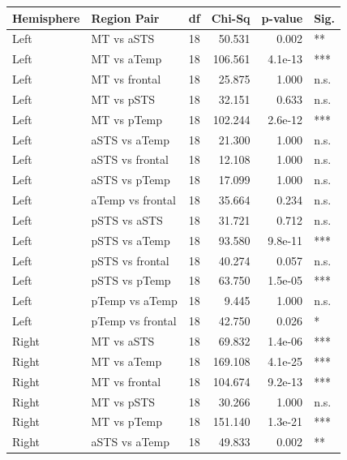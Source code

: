 \begin{table}[h]
\centering
\begin{tabular}{llrrrl}
\toprule
 Hemisphere   & Region Pair      &   df &   Chi-Sq &   p-value & Sig.   \\
\midrule
 Left         & MT vs aSTS       &   18 &   50.531 &     0.002 & **     \\
 Left         & MT vs aTemp      &   18 &  106.561 &   4.1e-13 & ***    \\
 Left         & MT vs frontal    &   18 &   25.875 &     1.000 & n.s.   \\
 Left         & MT vs pSTS       &   18 &   32.151 &     0.633 & n.s.   \\
 Left         & MT vs pTemp      &   18 &  102.244 &   2.6e-12 & ***    \\
 Left         & aSTS vs aTemp    &   18 &   21.300 &     1.000 & n.s.   \\
 Left         & aSTS vs frontal  &   18 &   12.108 &     1.000 & n.s.   \\
 Left         & aSTS vs pTemp    &   18 &   17.099 &     1.000 & n.s.   \\
 Left         & aTemp vs frontal &   18 &   35.664 &     0.234 & n.s.   \\
 Left         & pSTS vs aSTS     &   18 &   31.721 &     0.712 & n.s.   \\
 Left         & pSTS vs aTemp    &   18 &   93.580 &   9.8e-11 & ***    \\
 Left         & pSTS vs frontal  &   18 &   40.274 &     0.057 & n.s.   \\
 Left         & pSTS vs pTemp    &   18 &   63.750 &   1.5e-05 & ***    \\
 Left         & pTemp vs aTemp   &   18 &    9.445 &     1.000 & n.s.   \\
 Left         & pTemp vs frontal &   18 &   42.750 &     0.026 & *      \\
 Right        & MT vs aSTS       &   18 &   69.832 &   1.4e-06 & ***    \\
 Right        & MT vs aTemp      &   18 &  169.108 &   4.1e-25 & ***    \\
 Right        & MT vs frontal    &   18 &  104.674 &   9.2e-13 & ***    \\
 Right        & MT vs pSTS       &   18 &   30.266 &     1.000 & n.s.   \\
 Right        & MT vs pTemp      &   18 &  151.140 &   1.3e-21 & ***    \\
 Right        & aSTS vs aTemp    &   18 &   49.833 &     0.002 & **     \\

\end{tabular}
\end{table}
